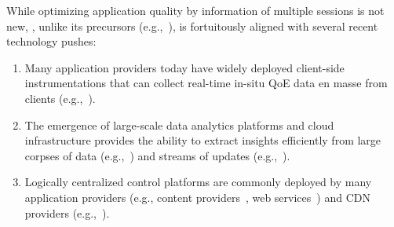 While optimizing application quality by information of multiple sessions is not 
new, \ddn, unlike its precursors (e.g.,~\cite{spand}), is fortuitously aligned with several recent  technology pushes:
\begin{enumerate}
\item Many application providers today have widely deployed client-side 
instrumentations that can collect real-time in-situ QoE data 
en masse from clients (e.g.,~\cite{sigcomm11,via,akamai-imc12,artizanetworks}). 
\item The emergence of large-scale data analytics platforms and cloud infrastructure 
provides the ability to extract insights efficiently from large corpses 
of data (e.g.,~\cite{spark}) and streams of updates 
(e.g.,~\cite{zaharia2013discretized}). 
\item Logically centralized control platforms are commonly deployed by many 
application providers (e.g., content providers~\cite{c3}, web services~\cite{footprint}) and CDN providers (e.g.,~\cite{chen2015end,mukerjee2015practical}).
\end{enumerate}

%
%
%




